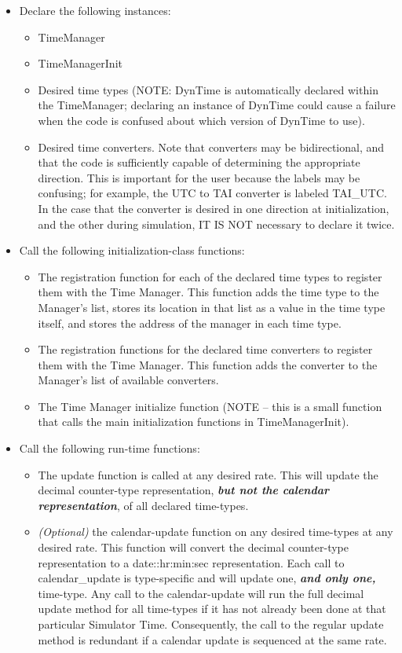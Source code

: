 \begin{itemize}
\item Declare the following instances:

\begin{itemize}
\item TimeManager
\item TimeManagerInit
\item Desired time types (NOTE:  DynTime is automatically declared
within the TimeManager; declaring an instance of DynTime could cause a
failure when the code is confused about which version of DynTime to
use).
\item Desired time converters.  Note that converters may be
bidirectional, and that the code is sufficiently capable of
determining the appropriate direction.  This is important for the user
because the labels may be confusing; for example, the UTC to TAI
converter is labeled TAI\_UTC.  In the case that the converter is
desired in one direction at initialization, and the other during
simulation, IT IS NOT necessary to declare it twice.
\end{itemize}
\item Call the following initialization-class functions:

\begin{itemize}
\item The registration function for each of the declared time types to
register them with the Time Manager.  This function adds the time type
to the Manager's list, stores its location in that
list as a value in the time type itself, and stores the address of the
manager in each time type.
\item The registration functions for the declared time converters to
register them with the Time Manager.  This function adds the converter
to the Manager's list of available converters.
\item The Time Manager initialize function (NOTE -- this is a small
function that calls the main initialization functions in
TimeManagerInit).
\end{itemize}
\item Call the following run-time functions:

\begin{itemize}
\item The update function is called at any desired rate.  This will update
the decimal counter-type representation, \textbf{\textit{but not the
calendar representation}}, of all declared time-types.
\item \textit{(Optional) }the calendar-update function on any desired
time-types at any desired rate.  This function will convert the decimal
counter-type representation to a date::hr:min:sec representation.  Each
call to calendar\_update is type-specific and will update one,
\textbf{\textit{and only one,}} time-type.  Any call to the calendar-update will run the full decimal update method for all time-types if it has not already been done at that particular Simulator Time.  Consequently, the call to the regular update method is redundant if a calendar update is sequenced at the same rate.
\end{itemize}
\end{itemize}



